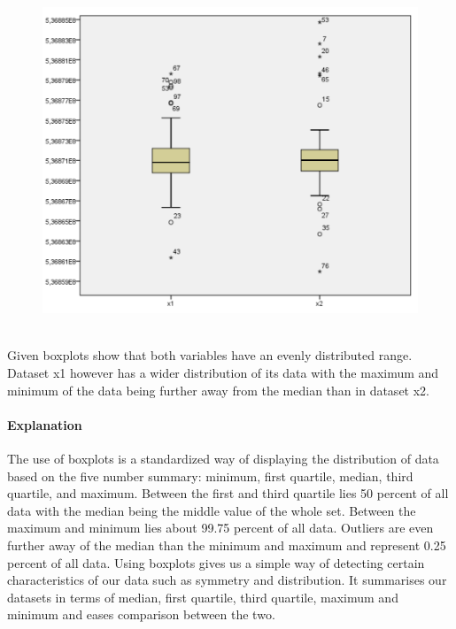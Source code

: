 \documentclass[14]{article}
\begin{document}
\begin{figure}[!htb]
	\includegraphics[width=1.0\textwidth]{img/question1/Question1_Boxplot.PNG}
	\captionsetup{width=1.0\textwidth}
	\centering
\end{figure}
\mbox{}\\ Given boxplots show that both variables have an evenly distributed range. Dataset x1 however has a wider distribution of its data with the maximum and minimum of the data being further away from the median than in dataset x2. 

\paragraph{Explanation}\mbox{}\newline
The use of boxplots is a standardized way of displaying the distribution of data based on the five number summary: minimum, first quartile, median, third quartile, and maximum. Between the first and third quartile lies 50 percent of all data with the median being the middle value of the whole set. Between the maximum and minimum lies about 99.75 percent of all data. Outliers are even further away of the median than the minimum and maximum and represent 0.25 percent of all data.
\newline 
Using boxplots gives us a simple way of detecting certain characteristics of our data such as symmetry and distribution. It summarises our datasets in terms of median, first quartile, third quartile, maximum and minimum and eases comparison between the two.  
\end{document}
